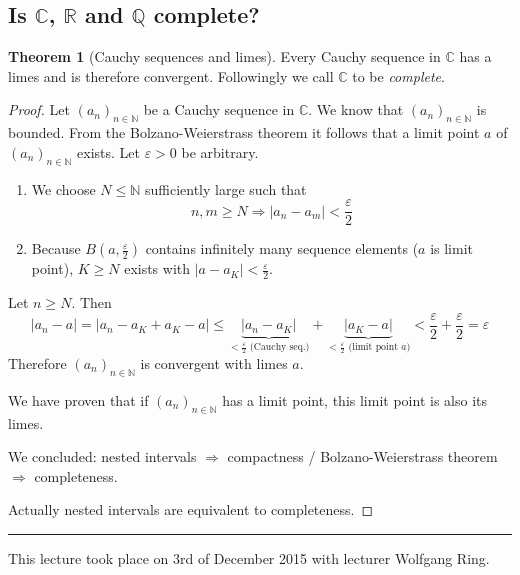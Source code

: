 \documentclass[a4paper,landscape,twocolumn]{article}
\theoremstyle{definition}
\newtheorem{theorem}{Theorem}
\newcommand\abs[1]{\left|#1\right|}
\newcommand\seq[1]{{\left(#1\right)}_{n \in \mathbb N}}
\newcommand\meta[3]{\hrule{} This #1 took place on #2 with lecturer #3.\par}
\begin{document}
\subsection{Is $\mathbb C$, $\mathbb R$ and $\mathbb Q$ complete?}
%
\begin{theorem}[Cauchy sequences and limes]
  Every Cauchy sequence in $\mathbb C$ has a limes and is therefore convergent.
  Followingly we call $\mathbb C$ to be \emph{complete}.
\end{theorem}
\begin{proof}
  Let $\seq{a_n}$ be a Cauchy sequence in $\mathbb C$.
  We know that $\seq{a_n}$ is bounded.
  From the Bolzano-Weierstrass theorem it follows that a limit point $a$
  of $\seq{a_n}$ exists. Let $\varepsilon > 0$ be arbitrary.
  \begin{enumerate}
    \item We choose $N \leq \mathbb N$ sufficiently large such that
      \[ n,m \geq N \Rightarrow \abs{a_n - a_m} < \frac\varepsilon2 \]
    \item Because $B(a, \frac\varepsilon2)$ contains infinitely many sequence elements ($a$ is limit point),
      $K \geq N$ exists with $\abs{a - a_K} < \frac{\varepsilon}{2}$.
  \end{enumerate}
  Let $n \geq N$. Then
  \[
      \abs{a_n - a}
      = \abs{a_n - a_K + a_K - a} \leq \underbrace{\abs{a_n - a_K}}_{< \frac\varepsilon2 \text{ (Cauchy seq.)}} + \underbrace{\abs{a_K - a}}_{< \frac\varepsilon2 \text{ (limit point $a$)}}
      < \frac\varepsilon2 + \frac\varepsilon2 = \varepsilon
  \]
  Therefore $\seq{a_n}$ is convergent with limes $a$.

  We have proven that if $\seq{a_n}$ has a limit point, this limit point is also its limes.

  We concluded: nested intervals $\Rightarrow$ compactness / Bolzano-Weierstrass theorem $\Rightarrow$ completeness.

  Actually nested intervals are equivalent to completeness.
\end{proof}

\meta{lecture}{3rd of December 2015}{Wolfgang Ring}
\end{document}
